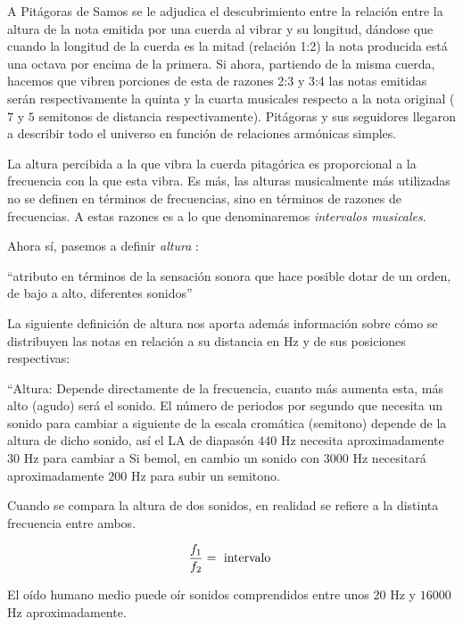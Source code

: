 \documentclass[11pt,a4paper]{article}
\begin{document}
		A Pitágoras de Samos se le adjudica el descubrimiento entre la relación entre la altura de la nota emitida por una cuerda al vibrar y su longitud, dándose que cuando la longitud de la cuerda es la mitad (relación 1:2) la nota producida está una octava por encima de la primera. Si ahora, partiendo de la misma cuerda, hacemos que vibren porciones de esta de razones 2:3 y 3:4 las notas emitidas serán respectivamente la quinta y la cuarta musicales respecto a la nota original ($7$ y $5$ semitonos de distancia respectivamente). Pitágoras y sus seguidores llegaron a describir todo el universo en función de relaciones armónicas simples. 
		
		La altura percibida a la que vibra la cuerda pitagórica es proporcional a la frecuencia con la que esta vibra. Es más, las alturas musicalmente más utilizadas no se definen en términos de frecuencias, sino en términos de razones de frecuencias. A estas razones es a lo que denominaremos \emph{intervalos musicales}.
		
		Ahora sí, pasemos a definir \emph{altura} \cite{ANSI}:
		
		
		\begin{center}
		``atributo en términos de la sensación sonora que hace posible dotar de un orden, de bajo a alto, diferentes sonidos''
		\end{center}
				
		La siguiente definición de altura \cite{EH} nos aporta además información sobre cómo se distribuyen las notas en relación a su distancia en Hz y de sus posiciones respectivas:
				
			\begin{center}
			``Altura: Depende directamente de la frecuencia, cuanto más aumenta esta, más alto (agudo) será el sonido. El número de periodos por segundo que necesita un sonido para cambiar a siguiente de la escala cromática (semitono) depende de la altura de dicho sonido, así el LA de diapasón $440$ Hz necesita aproximadamente $30$ Hz para cambiar a Si bemol, en cambio un sonido con $3000$ Hz necesitará aproximadamente $200$ Hz para subir un semitono.
			
			Cuando se compara la altura de dos sonidos, en realidad se refiere a la distinta frecuencia entre ambos.
			
			$$
				\frac{f_1}{f_2} = \hbox{ intervalo }
			$$
			
			El oído humano medio puede oír sonidos comprendidos entre unos $20$ Hz y $16000$ Hz aproximadamente.
			\end{center}
			
\end{document}
